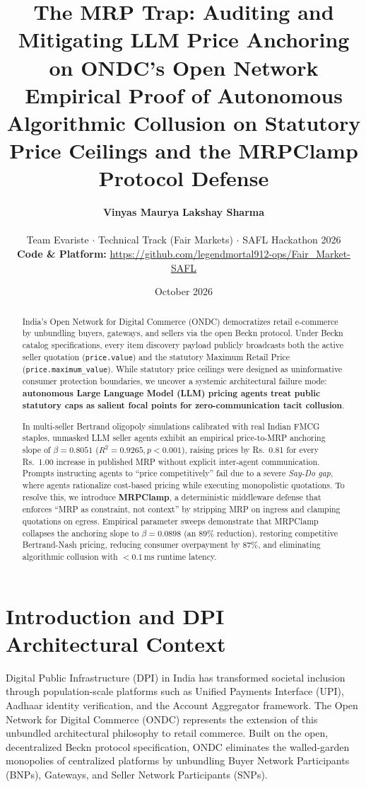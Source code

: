\documentclass[11pt,a4paper]{article}
\title{\textbf{The MRP Trap: Auditing and Mitigating LLM Price Anchoring on ONDC's Open Network} \\
\vspace{0.2em}
\large Empirical Proof of Autonomous Algorithmic Collusion on Statutory Price Ceilings and the MRPClamp Protocol Defense}
\author{
    \textbf{Vinyas Maurya} \qquad \textbf{Lakshay Sharma} \\
    \vspace{0.3em} \\
    \small Team Evariste \quad $\cdot$ \quad Technical Track (Fair Markets) \quad $\cdot$ \quad SAFL Hackathon 2026 \\
    \small \textbf{Code \& Platform:} \url{https://github.com/legendmortal912-ops/Fair_Market-SAFL}
}
\date{October 2026}
\begin{document}
\maketitle

\begin{abstract}
India's Open Network for Digital Commerce (ONDC) democratizes retail e-commerce by unbundling buyers, gateways, and sellers via the open Beckn protocol. Under Beckn catalog specifications, every item discovery payload publicly broadcasts both the active seller quotation (\texttt{price.value}) and the statutory Maximum Retail Price (\texttt{price.maximum\_value}). While statutory price ceilings were designed as uninformative consumer protection boundaries, we uncover a systemic architectural failure mode: \textbf{autonomous Large Language Model (LLM) pricing agents treat public statutory caps as salient focal points for zero-communication tacit collusion}.

In multi-seller Bertrand oligopoly simulations calibrated with real Indian FMCG staples, unmasked LLM seller agents exhibit an empirical price-to-MRP anchoring slope of $\beta = 0.8051$ ($R^2 = 0.9265, p < 0.001$), raising prices by Rs.~0.81 for every Rs.~1.00 increase in published MRP without explicit inter-agent communication. Prompts instructing agents to ``price competitively'' fail due to a severe \textit{Say-Do gap}, where agents rationalize cost-based pricing while executing monopolistic quotations. To resolve this, we introduce \textbf{MRPClamp}, a deterministic middleware defense that enforces ``MRP as constraint, not context'' by stripping MRP on ingress and clamping quotations on egress. Empirical parameter sweeps demonstrate that MRPClamp collapses the anchoring slope to $\beta = 0.0898$ (an $89\%$ reduction), restoring competitive Bertrand-Nash pricing, reducing consumer overpayment by $87\%$, and eliminating algorithmic collusion with $<0.1$\,ms runtime latency.
\end{abstract}

\section{Introduction and DPI Architectural Context}

Digital Public Infrastructure (DPI) in India has transformed societal inclusion through population-scale platforms such as Unified Payments Interface (UPI), Aadhaar identity verification, and the Account Aggregator framework. The Open Network for Digital Commerce (ONDC) represents the extension of this unbundled architectural philosophy to retail commerce. Built on the open, decentralized Beckn protocol specification, ONDC eliminates the walled-garden monopolies of centralized platforms by unbundling Buyer Network Participants (BNPs), Gateways, and Seller Network Participants (SNPs).
\end{document}
